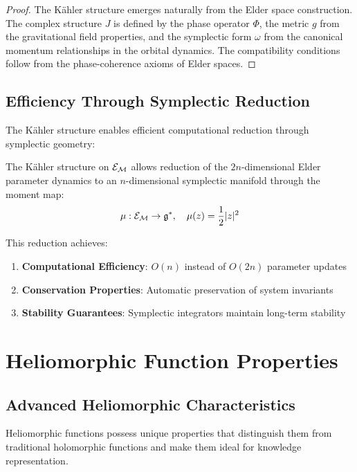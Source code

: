 \begin{proof}
The Kähler structure emerges naturally from the Elder space construction. The complex structure $J$ is defined by the phase operator $\Phi$, the metric $g$ from the gravitational field properties, and the symplectic form $\omega$ from the canonical momentum relationships in the orbital dynamics. The compatibility conditions follow from the phase-coherence axioms of Elder spaces.
\end{proof}

\subsection{Efficiency Through Symplectic Reduction}

The Kähler structure enables efficient computational reduction through symplectic geometry:

\begin{theorem}
\label{thm:symplectic_efficiency}
The Kähler structure on $\mathcal{E}_{\mathcal{M}}$ allows reduction of the $2n$-dimensional Elder parameter dynamics to an $n$-dimensional symplectic manifold through the moment map:
\begin{equation}
\mu: \mathcal{E}_{\mathcal{M}} \rightarrow \mathfrak{g}^*, \quad \mu(z) = \frac{1}{2}|z|^2
\end{equation}

This reduction achieves:
\begin{enumerate}
    \item \textbf{Computational Efficiency}: $O(n)$ instead of $O(2n)$ parameter updates
    \item \textbf{Conservation Properties}: Automatic preservation of system invariants
    \item \textbf{Stability Guarantees}: Symplectic integrators maintain long-term stability
\end{enumerate}
\end{theorem}

\section{Heliomorphic Function Properties}

\subsection{Advanced Heliomorphic Characteristics}

Heliomorphic functions possess unique properties that distinguish them from traditional holomorphic functions and make them ideal for knowledge representation.

